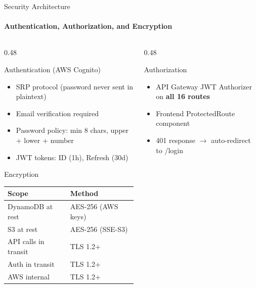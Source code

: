 \documentclass[aspectratio=169,11pt]{beamer}
\begin{document}
\begin{frame}[shrink=11]{Security Architecture}
\framesubtitle{Authentication, Authorization, and Encryption}

\vspace{-0.5em}

\begin{columns}[T]
\begin{column}{0.48\textwidth}
\begin{block}{Authentication (AWS Cognito)}
{\small
\begin{itemize}
    \item SRP protocol (password never sent in plaintext)
    \item Email verification required
    \item Password policy: min 8 chars, upper + lower + number
    \item JWT tokens: ID (1h), Refresh (30d)
\end{itemize}
}
\end{block}

\vspace{0.3em}
\begin{block}{Encryption}
{\small
\begin{center}
\begin{tabular}{ll}
\toprule
\textbf{Scope} & \textbf{Method} \\
\midrule
DynamoDB at rest & AES-256 (AWS keys) \\
S3 at rest & AES-256 (SSE-S3) \\
API calls in transit & TLS 1.2+ \\
Auth in transit & TLS 1.2+ \\
AWS internal & TLS 1.2+ \\
\bottomrule
\end{tabular}
\end{center}
}
\end{block}
\end{column}

\begin{column}{0.48\textwidth}
\begin{block}{Authorization}
{\small
\begin{itemize}
    \item API Gateway JWT Authorizer on \textbf{all 16 routes}
    \item Frontend ProtectedRoute component
    \item 401 response $\rightarrow$ auto-redirect to /login
\end{itemize}
}
\end{block}


\end{column}
\end{columns}
\end{frame}
\end{document}

